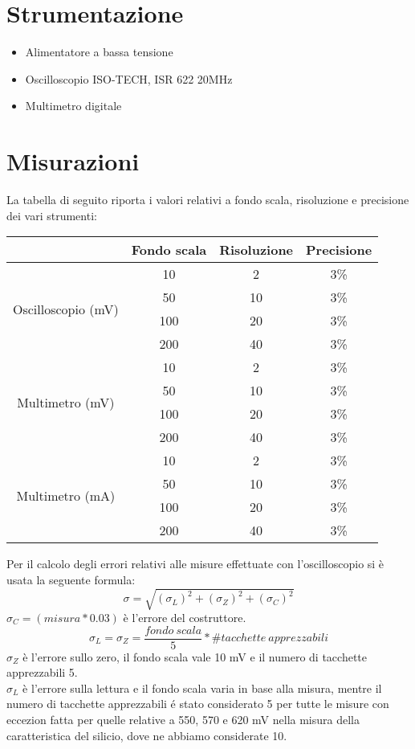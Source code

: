 \documentclass[]{article}
\begin{document}
\section{Strumentazione}
\begin{itemize}
	\item Alimentatore a bassa tensione
	\item Oscilloscopio ISO-TECH, ISR 622 20MHz
	\item Multimetro digitale
\end{itemize}
\section{Misurazioni}
La tabella di seguito riporta i valori relativi a fondo scala, risoluzione e precisione dei vari strumenti:
\begin{center}
\begin{tabular}{|c|c|c|c|}
	\cline{2-4}
	\multicolumn{1}{c|}{} & Fondo scala & Risoluzione & Precisione \\
	\hline
	\multirow{4}{*}{Oscilloscopio (mV)} & 10 & 2 & 3\% \\
	\cline{2-4}
	& 50 & 10 & 3\% \\
	\cline{2-4}
	& 100 & 20 & 3\% \\
	\cline{2-4}
	& 200 & 40 & 3\% \\
	\hline
	\multirow{4}{*}{Multimetro (mV)} & 10 & 2 & 3\% \\
	\cline{2-4}
	& 50 & 10 & 3\% \\
	\cline{2-4}
	& 100 & 20 & 3\% \\
	\cline{2-4}
	& 200 & 40 & 3\% \\
	\hline
	\multirow{4}{*}{Multimetro (mA)} & 10 & 2 & 3\% \\
	\cline{2-4}
	& 50 & 10 & 3\% \\
	\cline{2-4}
	& 100 & 20 & 3\% \\
	\cline{2-4}
	& 200 & 40 & 3\% \\
	\hline
\end{tabular}
\end{center}
Per il calcolo degli errori relativi alle misure effettuate con l'oscilloscopio si è usata la seguente formula:
\begin{equation}
	\sigma=\sqrt{(\sigma_{L})^{2}+(\sigma_{Z})^{2}+(\sigma_{C})^{2}}
\end{equation}
$ 	\sigma_{C}= (misura*0.03) $ è l'errore del costruttore.
\begin{equation*}
	\sigma_{L}=\sigma_{Z}=\frac{fondo \:scala}{5}*\#tacchette \:apprezzabili
\end{equation*}
$ \sigma_{Z} $ è l'errore sullo zero, il fondo scala vale 10 mV e il numero di tacchette apprezzabili 5.\\
$ \sigma_{L} $ è l'errore sulla lettura e il fondo scala varia in base alla misura, mentre il numero di tacchette apprezzabili é stato considerato 5 per tutte le misure con eccezion fatta per quelle relative a 550, 570 e 620 mV nella misura della caratteristica del silicio, dove ne abbiamo considerate 10.
\end{document}
